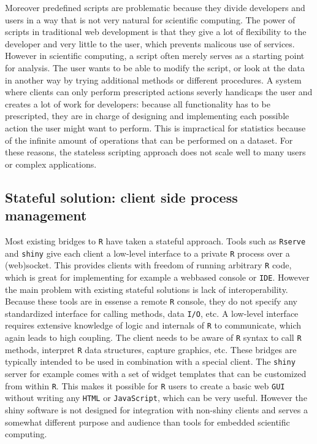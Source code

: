 \documentclass{article}
\newcommand{\R}{\texttt{R}\xspace}
\newcommand{\JavaScript}{\texttt{JavaScript}\xspace}
\newcommand{\GUI}{\texttt{GUI}\xspace}
\begin{document}
Moreover predefined scripts are problematic because they divide developers and users in a way that is not very natural for scientific computing. The power of scripts in traditional web development is that they give a lot of flexibility to the developer and very little to the user, which prevents malicous use of services. However in scientific computing, a script often  merely serves as a starting point for analysis. The user wants to be able to modify the script, or look at the data in another way by trying additional methods or different procedures. A system where clients can only perform prescripted actions severly handicaps the user and creates a lot of work for developers: because all functionality has to be prescripted, they are in charge of designing and implementing each possible action the user might want to perform. This is impractical for statistics because of the infinite amount of operations that can be performed on a dataset. For these reasons, the stateless scripting approach does not scale well to many users or complex applications.

\subsection{Stateful solution: client side process management}

Most existing bridges to \R have taken a stateful approach. Tools such as \texttt{Rserve} \citep{urbanek2013rserve} and \texttt{shiny} \citep{shiny} give each client a low-level interface to a private \R process over a (web)socket. This provides clients with freedom of running arbitrary \R code, which is great for implementing for example a webbased console or \texttt{IDE}. However the main problem with existing stateful solutions is lack of interoperability. Because these tools are in essense a remote \R console, they do not specify any standardized interface for calling methods, data \texttt{I/O}, etc. A low-level interface requires extensive knowledge of logic and internals of \R to communicate, which again leads to high coupling. The client needs to be aware of \R syntax to call \R methods, interpret \R data structures, capture graphics, etc. These bridges are typically intended to be used in combination with a special client. The \texttt{shiny} server for example comes with a set of widget templates that can be customized from within \R. 
This makes it possible for \R users to create a basic web \GUI without writing any \texttt{HTML} or \JavaScript, which can be very useful.
However the shiny software is not designed for integration with non-shiny clients and serves a somewhat different purpose and audience than tools for embedded scientific computing.
\end{document}
